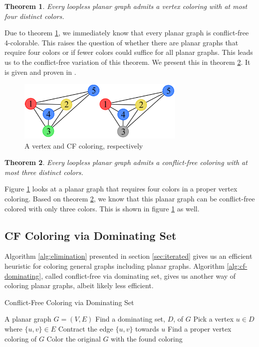 \documentclass{sig-alternate}
\newtheorem{theorem}{Theorem}
\begin{document}
\begin{theorem} \label{thm:four}
Every loopless planar graph admits a vertex coloring with at most four distinct colors.
\end{theorem}

Due to theorem \ref{thm:four}, we immediately know that every planar graph is conflict-free 4-colorable. This raises the question of whether there are planar graphs that require four colors or if fewer colors could suffice for all planar graphs. This leads us to the conflict-free variation of this theorem. We present this in theorem \ref{thm:four-cf}. It is given and proven in \cite{abel2017three}.

\begin{figure}[h]
	\centering
	\includegraphics[width=8cm,trim=4 4 4 4,clip]{../figures/four.pdf}
	\caption{A vertex and CF coloring, respectively}\label{fig:four}
\end{figure}

\begin{theorem} \label{thm:four-cf}
Every loopless planar graph admits a conflict-free coloring with at most three distinct colors.
\end{theorem}

Figure \ref{fig:four} looks at a planar graph that requires four colors in a proper vertex coloring. Based on theorem \ref{thm:four-cf}, we know that this planar graph can be conflict-free colored with only three colors. This is shown in figure \ref{fig:four} as well.

\subsection{CF Coloring via Dominating Set}
\label{sec:coloring-dom}
Algorithm \ref{alg:elimination} presented in section \ref{sec:iterated} gives us an efficient heuristic for coloring general graphs including planar graphs. Algorithm \ref{alg:cf-dominating}, called conflict-free via dominating set, gives us another way of coloring planar graphs, albeit likely less efficient.

\begin{algorithm}
\caption{Conflict-Free Coloring via Dominating Set} \label{alg:cf-dominating}
\begin{algorithmic}[1]
\Input A planar graph $G = (V, E)$
\State Find a dominating set, $D$, of $G$
	\State Pick a vertex $u \in D$ where $\{u, v\} \in E$
	\State Contract the edge $\{u,v\}$ towards $u$
\EndFor
\State Find a proper vertex coloring of $G$
\State Color the original $G$ with the found coloring
\end{algorithmic}
\end{algorithm}
\end{document}
